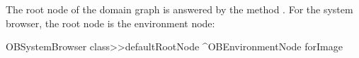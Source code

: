 \documentclass[a4paper,10pt,twoside]{book}
\begin{document}
The root node of the domain graph is answered by the method . For the system browser, the root node is the environment node:

\begin{code}{}
OBSystemBrowser class>>defaultRootNode
	^OBEnvironmentNode forImage
\end{code}





\end{document}

